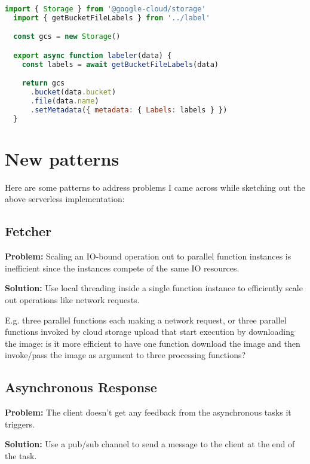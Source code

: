 \begin{lstlisting}[language=JavaScript,caption=Image labeler function handler,captionpos=b,label=lst:labelerhandler,showstringspaces=false,belowskip=2em,frame=tb,aboveskip=2em]
  import { Storage } from '@google-cloud/storage'
  import { getBucketFileLabels } from '../label'

  const gcs = new Storage()

  export async function labeler(data) {
    const labels = await getBucketFileLabels(data)

    return gcs
      .bucket(data.bucket)
      .file(data.name)
      .setMetadata({ metadata: { Labels: labels } })
  }
\end{lstlisting}

\section{New patterns} \label{sec:newPatterns}

Here are some patterns to address problems I came across while sketching out the above serverless implementation:

\subsection{Fetcher} \label{subsec:Fetcher}

\textbf{Problem:} Scaling an IO-bound operation out to parallel function instances is inefficient since the instances compete of the same IO resources.

\textbf{Solution:} Use local threading inside a single function instance to efficiently scale out operations like network requests.

E.g. three parallel functions each making a network request, or three parallel functions invoked by cloud storage upload that start execution by downloading the image: is it more efficient to have one function download the image and then invoke/pass the image as argument to three processing functions?

\subsection{Asynchronous Response} \label{subsec:AsyncResponse}

\textbf{Problem:} The client doesn't get any feedback from the asynchronous tasks it triggers.

\textbf{Solution:} Use a pub/sub channel to send a message to the client at the end of the task.

